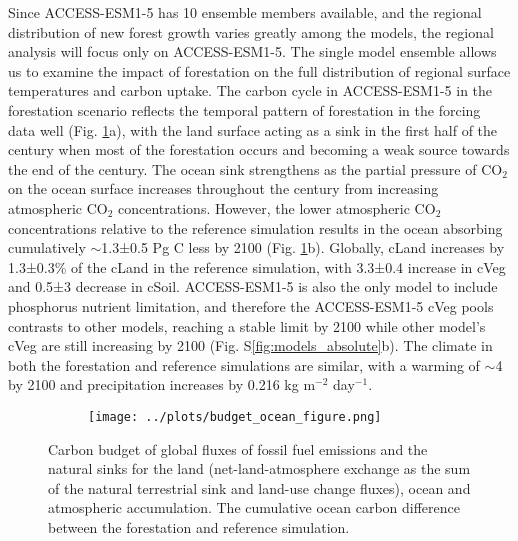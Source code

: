 \documentclass[]{article}
\begin{document}
Since ACCESS-ESM1-5 has 10 ensemble members available, and the regional distribution of new forest growth varies greatly among the models, the regional analysis will focus only on ACCESS-ESM1-5.
The single model ensemble allows us to examine the impact of forestation on the full distribution of regional surface temperatures and carbon uptake.
The carbon cycle in ACCESS-ESM1-5 in the forestation scenario reflects the temporal pattern of forestation in the forcing data well (Fig. \ref{fig:global_carbon_budget}a), with the land surface acting as a sink in the first half of the century when most of the forestation occurs and becoming a weak source towards the end of the century.
The ocean sink strengthens as the partial pressure of CO$_2$ on the ocean surface increases throughout the century from increasing atmospheric CO$_2$ concentrations.
However, the lower atmospheric CO$_2$ concentrations relative to the reference simulation results in the ocean absorbing cumulatively $\sim$1.3±0.5 Pg C less by 2100 (Fig. \ref{fig:global_carbon_budget}b).
Globally, cLand increases by 1.3±0.3\% of the cLand in the reference simulation, with 3.3±0.4 increase in cVeg and 0.5±3 decrease in cSoil.
ACCESS-ESM1-5 is also the only model to include phosphorus nutrient limitation, and therefore the ACCESS-ESM1-5 cVeg pools contrasts to other models, reaching a stable limit by 2100 while other model's cVeg are still increasing by 2100 (Fig. S\ref{fig:models_absolute}b).
The climate in both the forestation and reference simulations are similar, with a warming of $\sim$4 \textcelsius{} by 2100 and precipitation increases by 0.216 kg m$^{-2}$ day$^{-1}$.

\begin{figure}[H]
    \centering
    \begin{subfigure}[b]{\linewidth}
        \texttt{[image: ../plots/budget\_ocean\_figure.png]}
    \end{subfigure}
    \caption{Carbon budget of global fluxes of fossil fuel emissions and the natural sinks for the land (net-land-atmosphere exchange as the sum of the natural terrestrial sink and land-use change fluxes), ocean and atmospheric accumulation. The cumulative ocean carbon difference between the forestation and reference simulation.}
    \label{fig:global_carbon_budget}
\end{figure}
\end{document}
